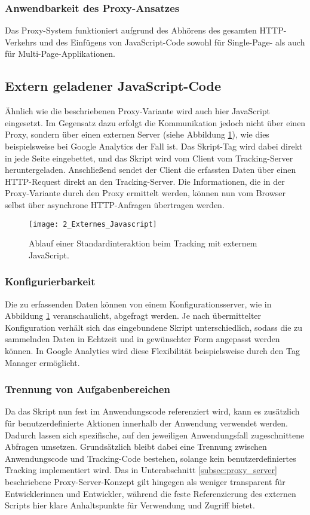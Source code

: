 \subsubsection{Anwendbarkeit des Proxy-Ansatzes}
Das Proxy-System funktioniert aufgrund des Abhörens des gesamten HTTP-Verkehrs und des Einfügens von JavaScript-Code sowohl für Single-Page- als auch für Multi-Page-Applikationen.

\subsection{Extern geladener JavaScript-Code}
\label{subsec:external_js}
Ähnlich wie die beschriebenen Proxy-Variante wird auch hier JavaScript eingesetzt. Im Gegensatz dazu erfolgt die Kommunikation jedoch nicht über einen Proxy, sondern über einen externen Server (siehe Abbildung \ref{fig:external_javascript}), wie dies beispielsweise bei Google Analytics der Fall ist. Das Skript-Tag wird dabei direkt in jede Seite eingebettet, und das Skript wird vom Client vom Tracking-Server heruntergeladen. Anschließend sendet der Client die erfassten Daten über einen HTTP-Request direkt an den Tracking-Server.  
Die Informationen, die in der Proxy-Variante durch den Proxy ermittelt werden, können nun vom Browser selbst über asynchrone HTTP-Anfragen übertragen werden.

\begin{figure}[H]
\centering
\texttt{[image: 2\_Externes\_Javascript]}
\caption{Ablauf einer Standardinteraktion beim Tracking mit externem JavaScript.}
\label{fig:external_javascript}
\end{figure}

\subsubsection{Konfigurierbarkeit}
Die zu erfassenden Daten können von einem Konfigurationsserver, wie in Abbildung \ref{fig:external_javascript} veranschaulicht, abgefragt werden. Je nach übermittelter Konfiguration verhält sich das eingebundene Skript unterschiedlich, sodass die zu sammelnden Daten in Echtzeit und in gewünschter Form angepasst werden können. In Google Analytics wird diese Flexibilität beispielsweise durch den Tag Manager ermöglicht.

\subsubsection{Trennung von Aufgabenbereichen}
Da das Skript nun fest im Anwendungscode referenziert wird, kann es zusätzlich für benutzerdefinierte Aktionen innerhalb der Anwendung verwendet werden. Dadurch lassen sich spezifische, auf den jeweiligen Anwendungsfall zugeschnittene Abfragen umsetzen. Grundsätzlich bleibt dabei eine Trennung zwischen Anwendungscode und Tracking-Code bestehen, solange kein benutzerdefiniertes Tracking implementiert wird.  
Das in Unterabschnitt \ref{subsec:proxy_server} beschriebene Proxy-Server-Konzept gilt hingegen als weniger transparent für Entwicklerinnen und Entwickler, während die feste Referenzierung des externen Scripts hier klare Anhaltspunkte für Verwendung und Zugriff bietet.

